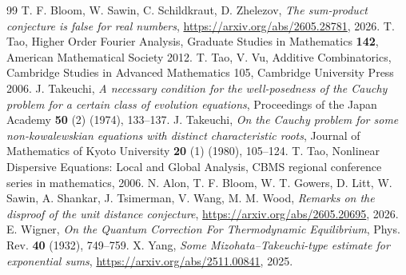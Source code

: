 \documentclass[10pt,a4paper]{amsart}
\numberwithin{equation}{section}
\begin{document}
\begin{thebibliography}{99}
 T. F. Bloom, W. Sawin, C. Schildkraut, D. Zhelezov, \textit{The sum-product conjecture is false for real numbers}, \url{https://arxiv.org/abs/2605.28781}, 2026.
 T. Tao, Higher Order Fourier Analysis, Graduate Studies in Mathematics \textbf{142}, American Mathematical Society 2012.
 T. Tao, V. Vu, Additive Combinatorics, Cambridge Studies in Advanced Mathematics 105, Cambridge University Press 2006.
 J. Takeuchi, \textit{A necessary condition for the well-posedness of the Cauchy problem for a certain class of evolution equations}, Proceedings of the Japan Academy \textbf{50} (2) (1974), 133--137.
 J. Takeuchi, \textit{On the Cauchy problem for some non-kowalewskian equations with distinct characteristic roots}, Journal of Mathematics of Kyoto University \textbf{20} (1) (1980), 105--124.
 T. Tao, Nonlinear Dispersive Equations: Local and Global Analysis, CBMS regional conference series in mathematics, 2006.
 N. Alon, T. F. Bloom, W. T. Gowers, D. Litt, W. Sawin, A. Shankar, J. Tsimerman, V. Wang, M. M. Wood, \textit{Remarks on the disproof of the unit distance conjecture}, \url{https://arxiv.org/abs/2605.20695}, 2026.
 E. Wigner, \textit{On the Quantum Correction For Thermodynamic Equilibrium}, Phys. Rev. \textbf{40} (1932), 749--759.
 X. Yang, \textit{Some Mizohata--Takeuchi-type estimate for exponential sums}, \url{https://arxiv.org/abs/2511.00841}, 2025.
\end{thebibliography}
\end{document}
